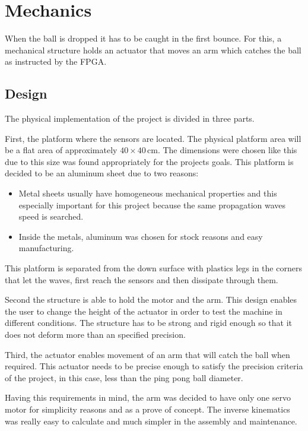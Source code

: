 \chapter{Mechanics} %
\label{chap:mechanics}
	When the ball is dropped it has to be caught in the first bounce. 
	For this, a mechanical structure holds an actuator that moves an arm which catches the ball as instructed by the FPGA.

	\section{Design} %
	\label{sec:mechanics_design}
		The physical implementation of the project is divided in three parts.

		First, the platform where the sensors are located. 
		The physical platform area will be a flat area of approximately $40\times40\,\si{\centi\meter}$.
		The dimensions were chosen like this due to this size was found appropriately for the projects goals. 
		This platform is decided to be an aluminum sheet due to two reasons: 
		\begin{itemize}
			\item Metal sheets usually have homogeneous mechanical properties and this especially important for this project because the same propagation waves speed is searched.
			\item Inside the metals, aluminum was chosen for stock reasons and easy manufacturing. 
		\end{itemize}
		This platform is separated from the down surface with plastics legs in the corners that let the waves, first reach the sensors and then dissipate through them.

		Second the structure is able to hold the motor and the arm. This design enables the user to change the height of the actuator in order to test the machine in different conditions. 
		The structure has to be strong and rigid enough so that it does not deform more than an specified precision.

		Third, the actuator enables movement of an arm that will catch the ball when required. 
		This actuator needs to be precise enough to satisfy the precision criteria of the project, in this case, less than the ping pong ball diameter. 
			
		Having this requirements in mind, the arm was decided to have only one servo motor for simplicity reasons and as a prove of concept. 
		The inverse kinematics was really easy to calculate and much simpler in the assembly and maintenance.
	
